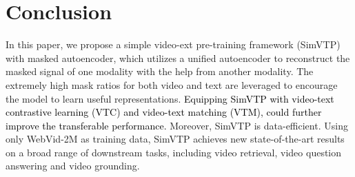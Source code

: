 \documentclass[10pt,twocolumn,letterpaper]{article}
\begin{document}
\section{Conclusion}
\label{sec:Con}
In this paper, we propose a simple video-ext pre-training framework (SimVTP) with masked autoencoder, which utilizes a unified autoencoder to reconstruct the masked signal of one modality with the help from another modality. The extremely high mask ratios for both video  and text are leveraged to encourage the model to learn useful representations.  \textcolor{black}{Equipping SimVTP with video-text contrastive learning (VTC) and video-text matching (VTM), could further improve the transferable performance.} Moreover, SimVTP is data-efficient. Using only WebVid-2M as training data, SimVTP achieves new state-of-the-art results on a broad range of downstream tasks, including video retrieval, video question answering and video grounding.


\balance
{\small
	
	
}
\clearpage


	
	
\end{document}
